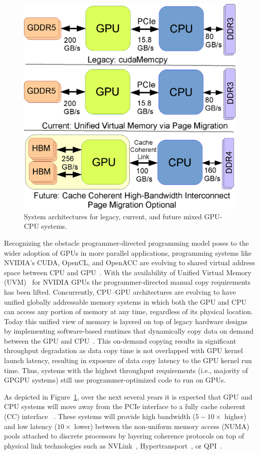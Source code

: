 \begin{figure}[t]
    \centering
    \includegraphics[width=0.4\columnwidth]{hpca2015/figures/architecture.eps}
    \caption{System architectures for legacy, current, and future mixed GPU-CPU systems.}
    \label{fig:arch-hpca2015}
\end{figure}

Recognizing the obstacle programmer-directed programming model poses to the
wider adoption of GPUs in more parallel applications, programming systems like
NVIDIA's CUDA, OpenCL, and OpenACC are evolving to shared virtual address space
between CPU and GPU~\cite{UVM}. With the availability of Unified Virtual Memory
(UVM)~\cite{UVM} for NVIDIA GPUs the programmer-directed manual copy
requirements has been lifted.  Concurrently, CPU--GPU architectures are evolving
to have unified globally addressable memory systems in which both the GPU and
CPU can access any portion of memory at any time, regardless of its physical
location.  Today this unified view of memory is layered on top of legacy
hardware designs by implementing software-based runtimes that dynamically copy
data on demand between the GPU and CPU~\cite{cuda}. This on-demand copying results in significant
throughput degradation as data copy time is not overlapped with GPU kernel
launch latency, resulting in exposure of data copy latency to the GPU kernel run
time. Thus, systems with the highest throughput requirements (i.e., majority of
GPGPU systems) still use programmer-optimized code to run on GPUs.

As depicted in Figure~\ref{fig:arch-hpca2015}, over the next several years it is
expected that GPU and CPU systems will move away from the PCIe interface to a
fully cache coherent (CC) interface ~\cite{AMDHSA}. These systems will provide
high bandwidth ($5-10\times$ higher) and low latency ($10\times$ lower) between
the non-uniform memory access (NUMA) pools attached to discrete processors by
layering coherence protocols on top of physical link technologies such as
NVLink~\cite{NVLINK}, Hypertransport~\cite{AMDHT}, or QPI~\cite{INTELQPI}.

